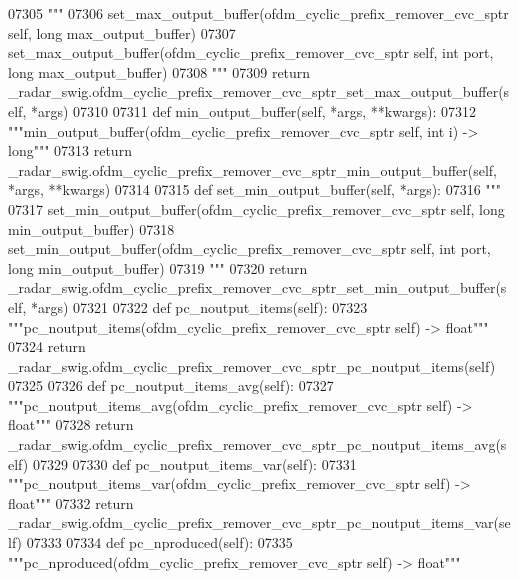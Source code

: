\begin{DoxyCode}
{{{{{{{{{{{{{{{{{{{{{{{{07305         \textcolor{stringliteral}{"""}
07306 \textcolor{stringliteral}{        set\_max\_output\_buffer(ofdm\_cyclic\_prefix\_remover\_cvc\_sptr self, long max\_output\_buffer)}
07307 \textcolor{stringliteral}{        set\_max\_output\_buffer(ofdm\_cyclic\_prefix\_remover\_cvc\_sptr self, int port, long max\_output\_buffer)}
07308 \textcolor{stringliteral}{        """}
07309         \textcolor{keywordflow}{return} \_radar\_swig.ofdm\_cyclic\_prefix\_remover\_cvc\_sptr\_set\_max\_output\_buffer(self, *args)
07310 
07311     \textcolor{keyword}{def }min_output_buffer(self, *args, **kwargs):
07312         \textcolor{stringliteral}{"""min\_output\_buffer(ofdm\_cyclic\_prefix\_remover\_cvc\_sptr self, int i) -> long"""}
07313         \textcolor{keywordflow}{return} \_radar\_swig.ofdm\_cyclic\_prefix\_remover\_cvc\_sptr\_min\_output\_buffer(self, *args, **kwargs)
07314 
07315     \textcolor{keyword}{def }set_min_output_buffer(self, *args):
07316         \textcolor{stringliteral}{"""}
07317 \textcolor{stringliteral}{        set\_min\_output\_buffer(ofdm\_cyclic\_prefix\_remover\_cvc\_sptr self, long min\_output\_buffer)}
07318 \textcolor{stringliteral}{        set\_min\_output\_buffer(ofdm\_cyclic\_prefix\_remover\_cvc\_sptr self, int port, long min\_output\_buffer)}
07319 \textcolor{stringliteral}{        """}
07320         \textcolor{keywordflow}{return} \_radar\_swig.ofdm\_cyclic\_prefix\_remover\_cvc\_sptr\_set\_min\_output\_buffer(self, *args)
07321 
07322     \textcolor{keyword}{def }pc_noutput_items(self):
07323         \textcolor{stringliteral}{"""pc\_noutput\_items(ofdm\_cyclic\_prefix\_remover\_cvc\_sptr self) -> float"""}
07324         \textcolor{keywordflow}{return} \_radar\_swig.ofdm\_cyclic\_prefix\_remover\_cvc\_sptr\_pc\_noutput\_items(self)
07325 
07326     \textcolor{keyword}{def }pc_noutput_items_avg(self):
07327         \textcolor{stringliteral}{"""pc\_noutput\_items\_avg(ofdm\_cyclic\_prefix\_remover\_cvc\_sptr self) -> float"""}
07328         \textcolor{keywordflow}{return} \_radar\_swig.ofdm\_cyclic\_prefix\_remover\_cvc\_sptr\_pc\_noutput\_items\_avg(self)
07329 
07330     \textcolor{keyword}{def }pc_noutput_items_var(self):
07331         \textcolor{stringliteral}{"""pc\_noutput\_items\_var(ofdm\_cyclic\_prefix\_remover\_cvc\_sptr self) -> float"""}
07332         \textcolor{keywordflow}{return} \_radar\_swig.ofdm\_cyclic\_prefix\_remover\_cvc\_sptr\_pc\_noutput\_items\_var(self)
07333 
07334     \textcolor{keyword}{def }pc_nproduced(self):
07335         \textcolor{stringliteral}{"""pc\_nproduced(ofdm\_cyclic\_prefix\_remover\_cvc\_sptr self) -> float"""}
}}}}}}}}}}}}}}}}}}}}}}}}
\end{DoxyCode}
